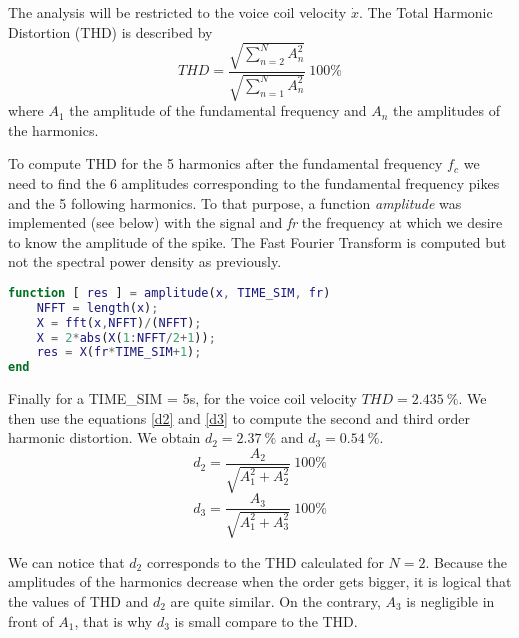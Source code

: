 The analysis will be restricted to the voice coil velocity $\dot{x}$. The Total Harmonic Distortion (THD) is described by
\begin{equation}
THD = \frac{\sqrt{\sum_{n=2}^{N}A_n^2}}{\sqrt{\sum_{n=1}^{N}A_n^2}} \ 100\%
\end{equation}
where $A_1$ the amplitude of the fundamental frequency and $A_n$ the amplitudes of the harmonics. 

To compute THD for the 5 harmonics after the fundamental frequency $f_c$ we need to find the 6 amplitudes corresponding to the fundamental frequency pikes and the 5 following harmonics. To that purpose, a function \textit{amplitude} was implemented (see below) with \textit{} the signal and \textit{fr} the frequency at which we desire to know the amplitude of the spike. The Fast Fourier Transform is computed but not the spectral power density as previously. 
\begin{lstlisting}[language=Matlab]
function [ res ] = amplitude(x, TIME_SIM, fr)
	NFFT = length(x);
	X = fft(x,NFFT)/(NFFT);	
	X = 2*abs(X(1:NFFT/2+1)); 
	res = X(fr*TIME_SIM+1);
end
\end{lstlisting}

Finally for a TIME\_SIM = 5s, for the voice coil velocity $THD = 2.435 \ \%$. 
We then use the equations \eqref{d2} and \eqref{d3} to compute the second and third order harmonic distortion. We obtain $d_2 = 2.37 \ \%$ and $d_3 = 0.54 \ \%$.
\begin{equation}
d_2 = \frac{A_2}{\sqrt{A_1^2 + A_2^2}} \ 100\%
\label{d2}
\end{equation}
\begin{equation}
d_3 = \frac{A_3}{\sqrt{A_1^2 + A_3^2}} \ 100\%
\label{d3}
\end{equation}

We can notice that $d_2$ corresponds to the THD calculated for $N=2$. Because the amplitudes of the harmonics decrease when the order gets bigger, it is logical that the values of THD and $d_2$ are quite similar. On the contrary, $A_3$ is negligible in front of $A_1$, that is why $d_3$ is small compare to the THD.